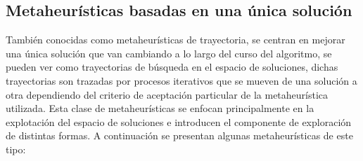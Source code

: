 \subsection{Metaheurísticas basadas en una única solución}

También conocidas como metaheurísticas de trayectoria, se centran en mejorar una única solución que van cambiando a lo largo del curso del algoritmo, se pueden ver como trayectorias de búsqueda en el espacio de soluciones, dichas trayectorias son trazadas por procesos iterativos que se mueven de una solución a otra dependiendo del criterio de aceptación particular de la metaheurística utilizada. Esta clase de metaheurísticas se enfocan principalmente en la explotación del espacio de soluciones e introducen el componente de exploración de distintas formas. A continuación se presentan algunas metaheurísticas de este tipo: 

